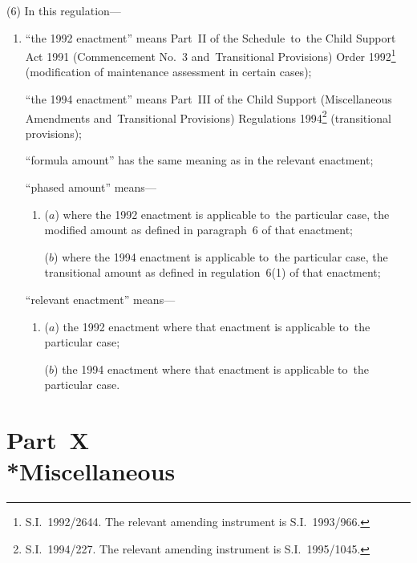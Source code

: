 \documentclass[12pt,a4paper]{article}
\begin{document}
(6) In this regulation—
\begin{enumerate}\item[]
“the 1992 enactment” means Part~II of the Schedule~to~the Child Support Act 1991
(Commencement No.\ 3 and~Transitional Provisions) Order 1992\footnote{\frenchspacing S.I.~1992/2644. The relevant amending instrument is S.I.~1993/966.} (modification of
maintenance assessment in certain cases);

“the 1994 enactment” means Part~III of the Child Support (Miscellaneous
Amendments and~Transitional Provisions) Regulations 1994\footnote{\frenchspacing S.I.~1994/227. The relevant amending instrument is S.I.~1995/1045.} (transitional
provisions);

“formula amount” has the same meaning as in the relevant enactment;

“phased amount” means—
\begin{enumerate}\item[]
($a$) where the 1992 enactment is applicable to~the particular case, the modified
amount as defined in paragraph~6 of that enactment;

($b$) where the 1994 enactment is applicable to~the particular case, the
transitional amount as defined in regulation~6(1) of that enactment;
\end{enumerate}

“relevant enactment” means—
\begin{enumerate}\item[]
($a$) the 1992 enactment where that enactment is applicable to~the particular case;

($b$) the 1994 enactment where that enactment is applicable to~the particular case.
\end{enumerate}
\end{enumerate}


\section[Part~X --- Miscellaneous]{Part~X\\*Miscellaneous}

\renewcommand\parthead{--- Part~X}
\end{document}
